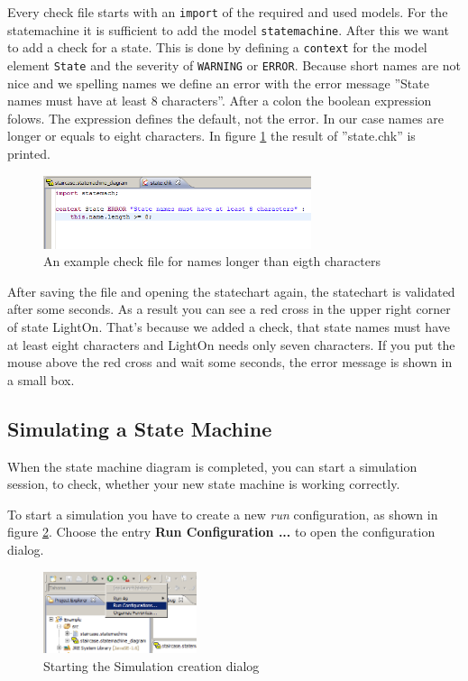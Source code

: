 Every check file starts with an \texttt{import} of the required and used models.
For the statemachine it is sufficient to add the model \texttt{statemachine}.
After this we want to add a check for a state. This is done by defining a
\texttt{context} for the model element \texttt{State} and the severity of
\texttt{WARNING} or \texttt{ERROR}. Because short names are not nice and we
spelling names we define an error with the error message ''State names must have
at least 8 characters''. After a colon the boolean expression folows. The
expression defines the default, not the error. In our case names are longer or
equals to eight characters. In figure \ref{fig:nameLengthCheck} the result of
''state.chk'' is printed.

\begin{figure}[ht] \center
\includegraphics[width=0.7\textwidth]{./Pictures/nameLengthCheck}
\caption{\label{fig:nameLengthCheck}An example check file for names longer 
than eigth characters}
\end{figure}

After saving the file and opening the statechart again, the statechart is
validated after some seconds. As a result you can see a red cross in the upper
right corner of state LightOn. That's because we added a check, that state names
must have at least eight characters and LightOn needs only seven characters. If
you put the mouse above the red cross and wait some seconds, the error message is
shown in a small box.

\subsection{Simulating a State Machine}
\label{sec:simulatingStateMachine}
When the state machine diagram is completed, you can start a simulation session,
to check, whether your new state machine is working correctly.

To start a simulation you have to create a new \textit{run} configuration, as
shown in figure \ref{fig:SimulationStart}. Choose the entry \textbf{Run
Configuration ...} to open the configuration dialog.

\begin{figure}[ht] \center
\includegraphics[width=0.4\textwidth]{./Pictures/startSimulation_1}
\caption{\label{fig:SimulationStart}Starting the Simulation creation dialog}
\end{figure}

